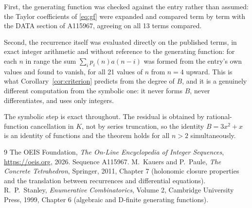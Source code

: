 \documentclass[11pt,a4paper]{article}
\theoremstyle{plain}
\theoremstyle{definition}
\begin{document}
First, the generating function was checked against the entry rather than assumed: the
Taylor coefficients of \eqref{eq:gf} were expanded and compared term by term with the DATA
section of A115967, agreeing on all 13 terms compared.

Second, the recurrence itself was evaluated directly on the published terms, in exact
integer arithmetic and without reference to the generating function: for each $n$ in range
the sum $\sum_{i}p_{i}(n)a(n-i)$ was formed from the entry's own values and found to
vanish, for all 21 values of $n$ from $n=4$ upward. This is what
Corollary~\ref{cor:criterion} predicts from the degree of $B$, and it is a genuinely
different computation from the symbolic one: it never forms $B$, never differentiates, and
uses only integers.

The symbolic step is exact throughout. The residual is obtained by rational-function
cancellation in $K$, not by series truncation, so the identity $B=3 x^{2} + x$ is an
identity of functions and the theorem holds for all $n>2$ simultaneously.

\begin{thebibliography}{9}
 The OEIS Foundation, \emph{The On-Line Encyclopedia of Integer Sequences},
\url{https://oeis.org}, 2026. Sequence A115967.
 M.~Kauers and P.~Paule, \emph{The Concrete Tetrahedron}, Springer, 2011,
Chapter 7 (holonomic closure properties and the translation between recurrences and
differential equations).
 R.~P.~Stanley, \emph{Enumerative Combinatorics}, Volume 2, Cambridge
University Press, 1999, Chapter 6 (algebraic and D-finite generating functions).
\end{thebibliography}
\end{document}
